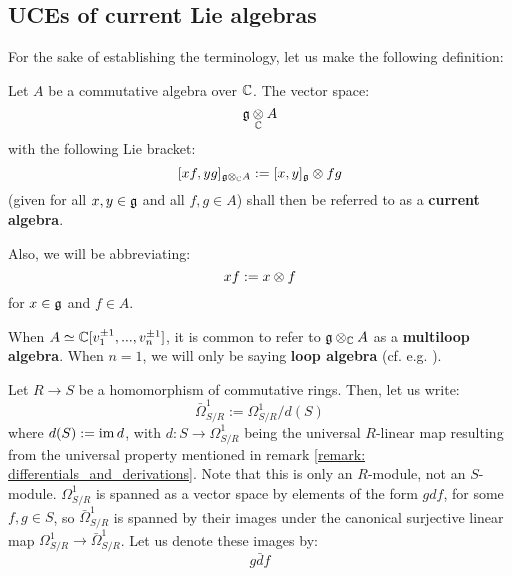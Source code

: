     \subsection{UCEs of current Lie algebras}
        For the sake of establishing the terminology, let us make the following definition:
        \begin{definition} \label{def: current_algebras}
            Let $A$ be a commutative algebra over $\mathbb{C}$. The vector space:
                $$\g \tensor_{\bbC} A$$
            with the following Lie bracket:
                $$[x f, y g]_{\g \tensor_{\bbC} A} := [x, y]_{\g} \tensor fg$$
            (given for all $x, y \in \mathfrak{g}$ and all $f, g \in A$) shall then be referred to as a \textbf{current algebra}. 
                
            Also, we will be abbreviating:
                $$xf := x \tensor f$$
            for $x \in \mathfrak{g}$ and $f \in A$.
        \end{definition}
        \begin{convention}
            When $A \simeq \mathbb{C}[v_1^{\pm 1}, ..., v_n^{\pm 1}]$, it is common to refer to $\g \tensor_{\bbC} A$ as a \textbf{multiloop algebra}. When $n = 1$, we will only be saying \textbf{loop algebra} (cf. e.g. \cite[Chapter 7]{kac_infinite_dimensional_lie_algebras}).
        \end{convention}

        \begin{convention} \label{conv: cyclic_1_forms}
            Let $R \to S$ be a homomorphism of commutative rings. Then, let us write:
                $$\bar{\Omega}^1_{S/R} := \Omega^1_{S/R}/d(S)$$
            where $d(S) := \operatorname{im} d$, with $d: S \to \Omega^1_{S/R}$ being the universal $R$-linear map resulting from the universal property mentioned in remark \ref{remark: differentials_and_derivations}. Note that this is only an $R$-module, not an $S$-module. $\Omega^1_{S/R}$ is spanned as a vector space by elements of the form $g df$, for some $f, g \in S$, so $\bar{\Omega}^1_{S/R}$ is spanned by their images under the canonical surjective linear map $\Omega^1_{S/R} \to \bar{\Omega}^1_{S/R}$. Let us denote these images by:
                $$g\bar{d}f$$
        \end{convention}


